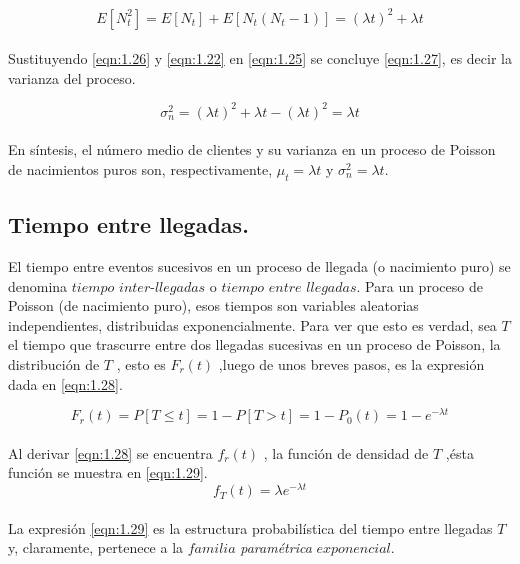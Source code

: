 \begin{equation}
    E\left [ N_{t}^{2} \right ]=E\left [ N_{t} \right ]+E\left [ N_{t} \left (  N_{t}-1 \right )\right ]=\left ( \lambda t \right )^{2}+\lambda t 
    \label{eqn:1.26}
\end{equation}
\\
Sustituyendo \ref{eqn:1.26} y \ref{eqn:1.22} en \ref{eqn:1.25} se concluye \ref{eqn:1.27}, es decir la varianza del proceso.

\begin{equation}
    \sigma _{n}^{2}=\left ( \lambda t \right )^{2}+\lambda t-\left ( \lambda t \right )^{2}=\lambda t
    \label{eqn:1.27}
\end{equation}
\\
En síntesis, el número medio de clientes y su varianza en un proceso de Poisson de nacimientos puros son, respectivamente, $ \mu _{t}=\lambda t $ y $ \sigma _{n}^{2}=\lambda t $.

\subsection{Tiempo entre llegadas.}
El tiempo entre eventos sucesivos en un proceso de llegada (o nacimiento puro) se denomina $tiempo$ $inter$-$llegadas$ o $tiempo$ $entre$ $llegadas$. Para un proceso de Poisson (de nacimiento puro), esos
tiempos son variables aleatorias independientes, distribuidas exponencialmente. Para ver que esto es verdad, sea $T$ el tiempo que trascurre entre dos llegadas sucesivas en un proceso de Poisson, la distribución de $T$ , esto es $F_{r}\left ( t \right )$ ,luego de unos breves pasos, es la expresión dada en \ref{eqn:1.28}.

\begin{equation}
    F_{r}\left ( t \right )=P\left [ T\leq t \right ]=1-P\left [ T>t \right ]=1-P_{0}(t)=1-e^{-\lambda t}
    \label{eqn:1.28}
\end{equation}
\\
Al derivar \ref{eqn:1.28} se encuentra  $f_{r}\left ( t \right )$ , la función de densidad de $T$ ,ésta función se muestra en \ref{eqn:1.29}.
\begin{equation}
    f_{T}\left ( t \right )=\lambda e^{-\lambda t }
    \label{eqn:1.29}
\end{equation}
\\
La expresión \ref{eqn:1.29} es la estructura probabilística del tiempo entre llegadas $T$ y, claramente, pertenece a la $familia$ {\em paramétrica} $exponencial.$

